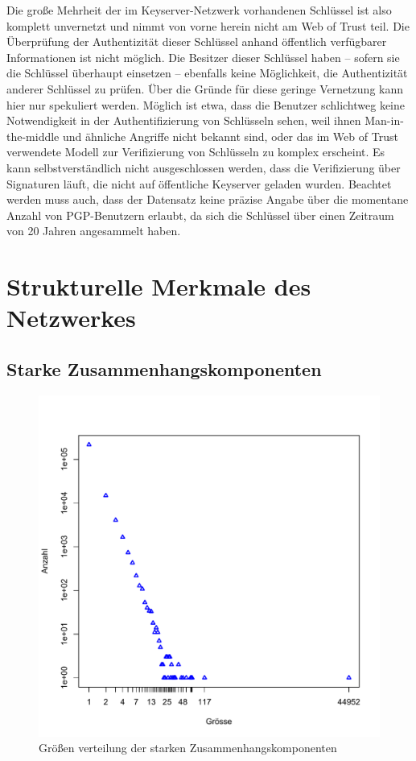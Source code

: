 Die große Mehrheit der im Keyserver-Netzwerk vorhandenen Schlüssel
ist also komplett unvernetzt und nimmt von vorne herein nicht am Web of
Trust teil. Die Überprüfung der Authentizität dieser Schlüssel
anhand öffentlich verfügbarer Informationen ist nicht
möglich. Die Besitzer dieser Schlüssel haben -- sofern sie die
Schlüssel überhaupt einsetzen -- ebenfalls keine Möglichkeit,
die Authentizität anderer Schlüssel zu prüfen. Über die
Gründe für diese geringe Vernetzung kann hier nur spekuliert
werden. Möglich ist etwa, dass die Benutzer schlichtweg keine
Notwendigkeit in der Authentifizierung von Schlüsseln sehen, weil
ihnen Man-in-the-middle und ähnliche Angriffe nicht bekannt sind,
oder das im Web of Trust verwendete Modell zur Verifizierung von
Schlüsseln zu komplex erscheint. Es kann selbstverständlich nicht
ausgeschlossen werden, dass die Verifizierung über Signaturen
läuft, die nicht auf öffentliche Keyserver geladen
wurden. Beachtet werden muss auch, dass der Datensatz keine präzise
Angabe über die momentane Anzahl von PGP-Benutzern erlaubt, da sich
die Schlüssel über einen Zeitraum von 20 Jahren angesammelt haben.

\section{Strukturelle Merkmale des Netzwerkes}
\label{sec:result-allg-merkm-des}

\subsection{Starke Zusammenhangskomponenten}
\label{sec:result-komponentenstruktur}

\begin{figure}[t]
  \centering
  \includegraphics[scale=0.42]{images/component-size.pdf}
  \caption{Größen verteilung der starken Zusammenhangskomponenten}
  \label{fig:component-size}
\end{figure}

